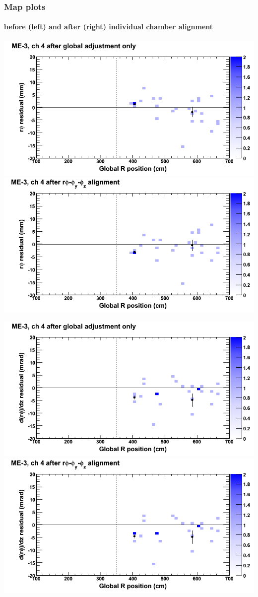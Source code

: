 \documentclass[compress]{beamer}
\begin{document}
\begin{frame}
\frametitle{Map plots}
\framesubtitle{before (left) and after (right) individual chamber alignment}
\includegraphics[width=0.5\linewidth]{ringmapplots_3dof/before_CSCvsr_mem3ch04_x.png} \includegraphics[width=0.5\linewidth]{ringmapplots_3dof/after_CSCvsr_mem3ch04_x.png}

\includegraphics[width=0.5\linewidth]{ringmapplots_3dof/before_CSCvsr_mem3ch04_dxdz.png} \includegraphics[width=0.5\linewidth]{ringmapplots_3dof/after_CSCvsr_mem3ch04_dxdz.png}
\end{frame}
\end{document}
